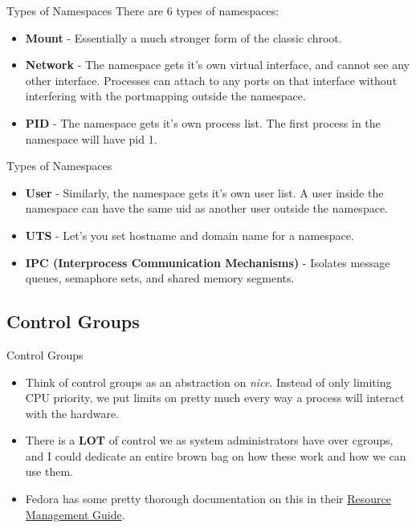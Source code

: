 \documentclass{beamer}
\begin{document}
\begin{frame}{Types of Namespaces}
There are 6 types of namespaces:
\begin{itemize}
\item \textbf{Mount} - Essentially a much stronger form of the classic chroot.
\item \textbf{Network} - The namespace gets it's own virtual interface, and cannot see any other interface. Processes can attach to any ports on that interface without interfering with the portmapping outside the namespace.
\item \textbf{PID} - The namespace gets it's own process list. The first process in the namespace will have pid 1.
\end{itemize}
\end{frame}

\begin{frame}{Types of Namespaces}
\begin{itemize}
\item \textbf{User} - Similarly, the namespace gets it's own user list. A user inside the namespace can have the same uid as another user outside the namespace.
\item \textbf{UTS} - Let's you set hostname and domain name for a namespace.
\item \textbf{IPC (Interprocess Communication Mechanisms)} - Isolates message queues, semaphore sets, and shared memory segments.
\end{itemize}
\end{frame}

\subsection{Control Groups}

\begin{frame}{Control Groups}
\begin{itemize}
\item Think of control groups as an abstraction on \textit{nice}.
Instead of only limiting CPU priority, we put limits on pretty much every way a process will interact with the hardware.
\item There is a \textbf{LOT} of control we as system administrators have over cgroups, and I could dedicate an entire brown bag on how these work and how we can use them.
\item Fedora has some pretty thorough documentation on this in their \href{https://docs.fedoraproject.org/en-US/Fedora/17/html/Resource_Management_Guide/index.html}{Resource Management Guide}.
\end{itemize}
\end{frame}
\end{document}
